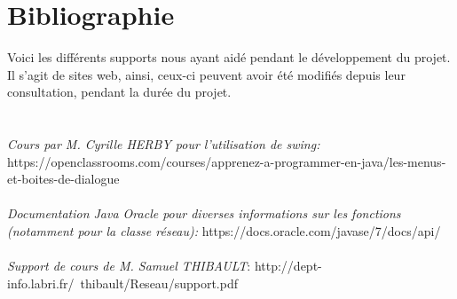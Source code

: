 \chapter{Bibliographie}
Voici les différents supports nous ayant aidé pendant le développement du projet. Il s'agit de sites web, ainsi, ceux-ci 
peuvent avoir été modifiés depuis leur consultation, pendant la durée du projet.
\\ 
\\ 
\\
\textit{Cours par M. Cyrille HERBY pour l'utilisation de swing:} https://openclassrooms.com/courses/apprenez-a-programmer-en-java/les-menus-et-boites-de-dialogue
\\
\\
\textit{Documentation Java Oracle pour diverses informations sur les fonctions (notamment pour la classe réseau):} https://docs.oracle.com/javase/7/docs/api/
\\
\\
\textit{Support de cours de M. Samuel THIBAULT}: http://dept-info.labri.fr/~thibault/Reseau/support.pdf